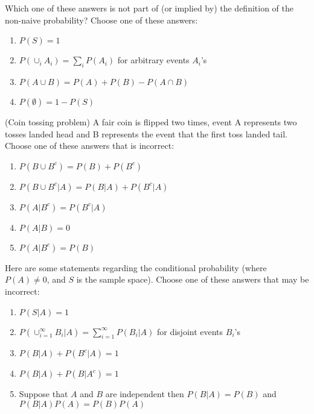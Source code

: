 \documentclass[poll_tutorial_format]{subfiles}
\begin{document}
\begin{exercise}
	Which one of these answers is not part of (or implied by) the definition of the non-naive probability?
	Choose one of these answers: %
	\begin{enumerate}
		\item $P(S)=1$
		\item $P(\cup_i A_i) = \sum_i P(A_i)$ for arbitrary events $A_i$'s
		\item $P(A\cup B)=P(A)+P(B)-P(A\cap B)$
		\item $P(\emptyset)=1-P(S)$
	\end{enumerate}
\end{exercise}



\begin{exercise}
	(Coin tossing problem) A fair coin is flipped two times, event A represents two tosses landed head and B represents the event that the first toss landed tail. 
	Choose one of these answers that is incorrect: %
	\begin{enumerate}
		\item $P(B\cup B^c )=P(B)+P(B^c)$
		\item $P(B\cup B^c |A)=P(B|A)+P(B^c|A)$
		\item $P(A|B^c)=P(B^c|A)$
		\item $P(A|B)=0$
		\item $P(A|B^c)=P(B)$
	\end{enumerate}
\end{exercise}


\begin{exercise}
	Here are some statements regarding the conditional probability (where $P(A)\neq 0$, and $S$ is the sample space).
	Choose one of these answers that may be incorrect: %
	\begin{enumerate}
		\item $P(S|A)=1$
		\item $P(\cup_{i=1}^\infty B_i|A) = \sum_{i=1}^\infty P(B_i|A)$ for disjoint events $B_i$'s
		\item $P(B|A)+P(B^c|A)=1$
		\item $P(B|A)+P(B|A^c)=1$ 
		\item Suppose that $A$ and $B$ are independent then $P(B|A)=P(B)$ and $P(B|A)P(A)=P(B)P(A)$ 
	\end{enumerate}
\end{exercise}
\end{document}
